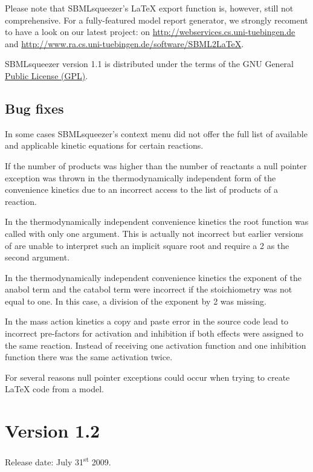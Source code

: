 Please note that SBMLsqueezer's \LaTeX{} export function is, however, still not
comprehensive. For a fully-featured model report generator, we strongly recoment
to have a look on our latest project: \SBMLLaTeX on
\url{http://webservices.cs.uni-tuebingen.de} and
\url{http://www.ra.cs.uni-tuebingen.de/software/SBML2LaTeX}.

SBMLsqueezer version 1.1 is distributed under the terms of the GNU General
\href{http://www.gnu.org/licenses/gpl.html}{Public License (GPL)}.

\subsection{Bug fixes}

In some cases SBMLsqueezer's context menu did not offer the full list of
available and applicable kinetic equations for certain reactions.

If the number of products was higher than the number of reactants a null pointer
exception was thrown in the thermodynamically independent form of the
convenience kinetics due to an incorrect access to the list of products of a
reaction.

In the thermodynamically independent convenience kinetics the root function was
called with only one argument. This is actually not incorrect but earlier
versions of \libSBML are unable to interpret such an implicit square root and
require a 2 as the second argument.

In the thermodynamically independent convenience kinetics the exponent of the
anabol term and the catabol term were incorrect if the stoichiometry was not
equal to one. In this case, a division of the exponent by 2 was missing.

In the mass action kinetics a copy and paste error in the source code lead to
incorrect pre-factors for activation and inhibition if both effects were
assigned to the same reaction. Instead of receiving one activation function and
one inhibition function there was the same activation twice.

For several reasons null pointer exceptions could occur when trying to create
\LaTeX{} code from a model.


\section{Version 1.2}

Release date: July 31\textsuperscript{st} 2009.


